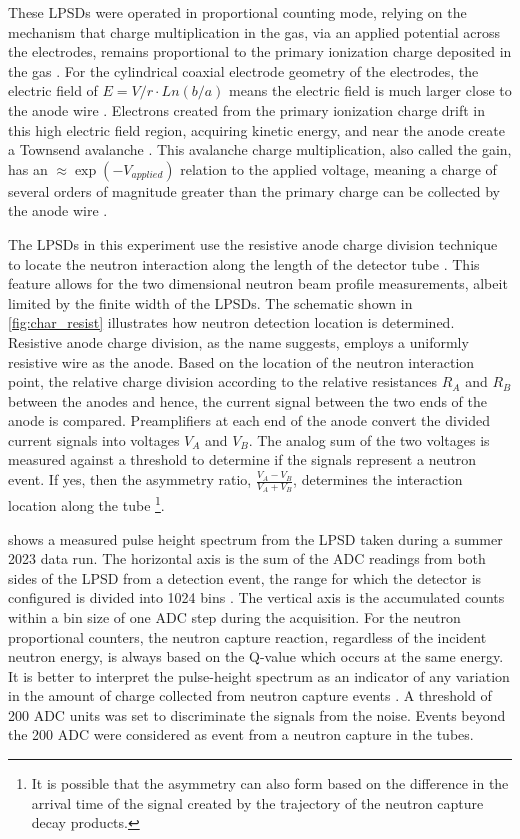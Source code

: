 These LPSDs were operated in proportional counting mode, relying on the mechanism that charge multiplication in the gas, via an applied potential across the electrodes, remains proportional to the primary ionization charge deposited in the gas \cite{Knoll2010, Diawara2023}. For the cylindrical coaxial electrode geometry of the electrodes, the electric field of $E=V/r \cdot Ln(b/a)$ means the electric field is much larger close to the anode wire \cite{Knoll2010, Diawara2023}. Electrons created from the primary ionization charge drift in this high electric field region, acquiring kinetic energy, and near the anode create a Townsend avalanche \cite{Knoll2010, Diawara2023}. This avalanche charge multiplication, also called the gain, has an $\approx \exp(-V_{applied})$ relation to the applied voltage, meaning a charge of several orders of magnitude greater than the primary charge can be collected by the anode wire \cite{Knoll2010, Diawara2023}. 

The LPSDs in this experiment use the resistive anode charge division technique to locate the neutron interaction along the length of the detector tube \cite{Alberi1977, Radeka1979}. This feature allows for the two dimensional neutron beam profile measurements, albeit limited by the finite width of the LPSDs. The schematic shown in \cref{fig:char_resist} illustrates how neutron detection location is determined. Resistive anode charge division, as the name suggests, employs a uniformly resistive wire as the anode. Based on the location of the neutron interaction point, the relative charge division according to the relative resistances $R_A$ and $R_B$ between the anodes and hence, the current signal between the two ends of the anode is compared. Preamplifiers at each end of the anode convert the divided current signals into voltages $V_A$ and $V_B$. The analog sum of the two voltages is measured against a threshold to determine if the signals represent  a neutron event. If yes, then the asymmetry ratio, $\frac{V_A-V_B}{V_A+V_B}$, determines the interaction location along the tube \footnote{It is possible that the asymmetry can also form based on the difference in the arrival time of the signal created by the trajectory of the neutron capture decay products.}. 

 shows a measured pulse height spectrum from the LPSD taken during a summer 2023 data run. The horizontal axis is the sum of the ADC readings from both sides of the LPSD from a detection event, the range for which the detector is configured is divided into 1024 bins \cite{Beal2021}. The vertical axis is the accumulated counts within a bin size of one ADC step during the acquisition. For the neutron proportional counters, the neutron capture reaction, regardless of the incident neutron energy, is always based on the Q-value which occurs at the same energy. It is better to interpret the pulse-height spectrum as an indicator of any variation in the amount of charge collected from neutron capture events \cite{Diawara2023}. A threshold of 200 ADC units was set to discriminate the signals from the noise. Events beyond the 200 ADC were considered as event from a neutron capture in the tubes.

